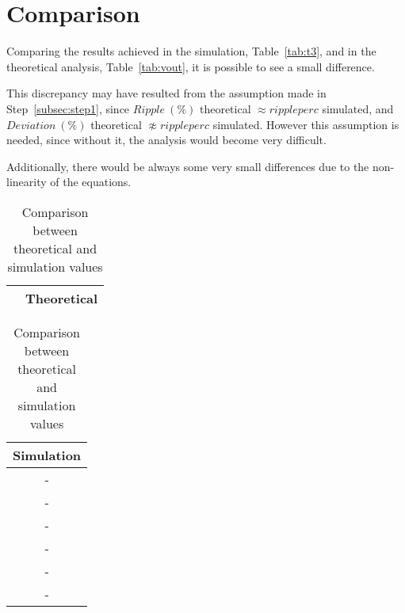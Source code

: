 \clearpage
\section{Comparison}
\label{sec:comparison}

Comparing the results achieved in the simulation, Table~\ref{tab:t3}, and in the theoretical
analysis, Table~\ref{tab:vout}, it is possible to see a small difference.

This discrepancy may have resulted from the assumption made in Step~\ref{subsec:step1},
since $Ripple\ (\%)$ theoretical $\approx rippleperc$ simulated, and
$Deviation\ (\%)$ theoretical $\not\approx rippleperc$ simulated. 
However this assumption is needed, since without it, the analysis would become very difficult.

Additionally, there would be always some very small differences due to the non-linearity of the equations.



\begin{table}[ht!]
  \centering
\begin{minipage}[b]{0.59\textwidth}
    \flushright
    \begin{tabular}{|c|c|}
      \hline    
       & \textbf{Theoretical} \\ \hline
      
    \end{tabular}
\end{minipage}
\begin{minipage}[b]{0.39\textwidth}
\flushleft
   \begin{tabular}{c|}
    \hline    
    \textbf{Simulation} \\ \hline
    - \\ \hline
    - \\ \hline
    - \\ \hline
    - \\ \hline
    
    
    - \\ \hline
    - \\ \hline
    
   \end{tabular}
\end{minipage}
\caption{Comparison between theoretical and simulation values}
\label{tab:comp}
\end{table}
